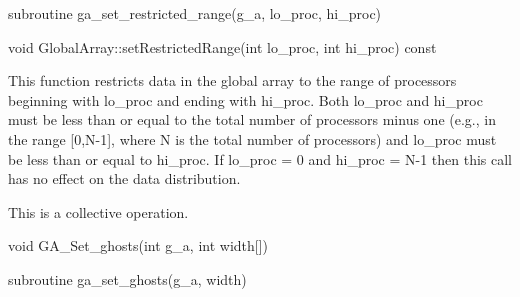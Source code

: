 \documentclass[12pt]{article}
\begin{document}
\begin{fapi}
\begin{fcode}
subroutine ga_set_restricted_range(g_a, lo_proc, hi_proc)
\end{fcode}
\begin{funcargs}
\end{funcargs}
\end{fapi}

\begin{cxxapi}
\begin{cxxcode}
void GlobalArray::setRestrictedRange(int lo_proc, int hi_proc) const
\end{cxxcode}
\begin{funcargs}
\end{funcargs}
\end{cxxapi}

\begin{desc}

  This function restricts data in the global array to the range of
  processors beginning with lo_proc and ending with hi_proc. Both
  lo_proc and hi_proc must be less than or equal to the total number
  of processors minus one (e.g., in the range [0,N-1], where N is the
  total number of processors) and lo_proc must be less than or equal
  to hi_proc. If lo_proc = 0 and hi_proc = N-1 then this call has no
  effect on the data distribution.

  This is a collective operation.

\end{desc}


\begin{capi}
\begin{ccode}
void GA_Set_ghosts(int g_a, int width[])
\end{ccode}
\begin{funcargs}
\end{funcargs}
\end{capi}

\begin{fapi}
\begin{fcode}
subroutine ga_set_ghosts(g_a, width)
\end{fcode}
\begin{funcargs}
\end{funcargs}
\end{fapi}
\end{document}
